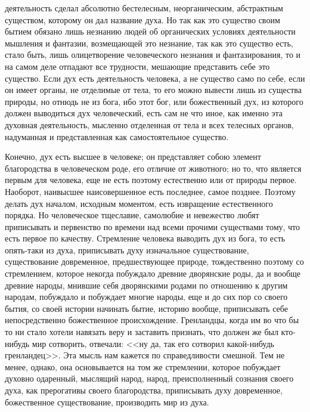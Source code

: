 \documentclass[12pt]{article}
\begin{document}
деятельность сделал абсолютно бестелесным, неорганическим, абстрактным существом, которому он дал название духа. Но так как это существо своим бытием обязано лишь незнанию людей об органических условиях деятельности мышления и фантазии, возмещающей это незнание, так как это существо есть, стало быть, лишь олицетворение человеческого незнания и фантазирования, то и на самом деле отпадают все трудности, мешающие представить себе это существо. Если дух есть деятельность человека, а не существо само по себе, если он имеет органы, не отделимые от тела, то его можно вывести лишь из существа природы, но отнюдь не из бога, ибо этот бог, или божественный дух, из которого должен выводиться дух человеческий, есть сам не что иное, как именно эта духовная деятельность, мысленно отделенная от тела и всех телесных органов, надуманная и представленная как самостоятельное существо. 

Конечно, дух есть высшее в человеке; он представляет собою элемент благородства в человеческом роде, его отличие от животного; но то, что является первым для человека, еще не есть поэтому естественно или от природы первое. Наоборот, наивысшее наисовершенное есть последнее, самое позднее. Поэтому делать дух началом, исходным моментом, есть извращение естественного порядка. Но человеческое тщеславие, самолюбие и невежество любят приписывать и первенство по времени над всеми прочими существами тому, что есть первое по качеству. Стремление человека выводить дух из бога, то есть опять-таки из духа, приписывать духу изначальное существование, существование довременное, предшествующее природе, тождественно поэтому со стремлением, которое некогда побуждало древние дворянские роды, да и вообще древние народы, мнившие себя дворянскими родами по отношению к другим народам, побуждало и побуждает многие народы, еще и до сих пор со своего бытия, со своей истории начинать бытие, историю вообще, приписывать себе непосредственно божественное происхождение. Гренландцы, когда им во что бы то ни стало хотели навязать веру и заставить признать, что должен же был кто-нибудь мир сотворить, отвечали: <<ну да, так его сотворил какой-нибудь гренландец>>. Эта мысль нам кажется по справедливости смешной. Тем не менее, однако, она основывается на том же стремлении, которое побуждает духовно одаренный, мыслящий народ, народ, преисполненный сознания своего духа, как прерогативы своего благородства, приписывать духу довременное, божественное существование, производить мир из духа. 
\end{document}
